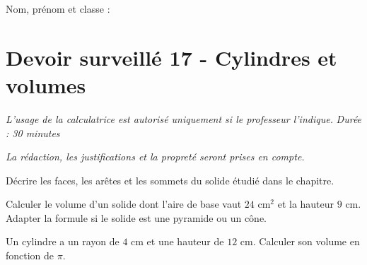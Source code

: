 \documentclass[a4paper,10pt]{report}
\begin{document}
\pagestyle{empty}
\noindent Nom, prénom et classe : \dotfill

\section*{Devoir surveillé 17 - Cylindres et volumes}

\noindent \textit{L'usage de la calculatrice est autorisé uniquement si le professeur l'indique.} \hfill \textit{Durée : 30 minutes}

\medskip
\noindent \textit{La rédaction, les justifications et la propreté seront prises en compte.}


\begin{ex}[Vocabulaire]
Décrire les faces, les arêtes et les sommets du solide étudié dans le chapitre.
\medskip\noindent\grandscarreaux{\linewidth}{3cm}
\end{ex}
\begin{ex}[Volume]
Calculer le volume d'un solide dont l'aire de base vaut $24$ cm$^2$ et la hauteur $9$ cm. Adapter la formule si le solide est une pyramide ou un cône.
\medskip\noindent\grandscarreaux{\linewidth}{4cm}
\end{ex}
\begin{ex}[Problème]
Un cylindre a un rayon de $4$ cm et une hauteur de $12$ cm. Calculer son volume en fonction de $\pi$.
\medskip\noindent\grandscarreaux{\linewidth}{4cm}
\end{ex}
\end{document}
